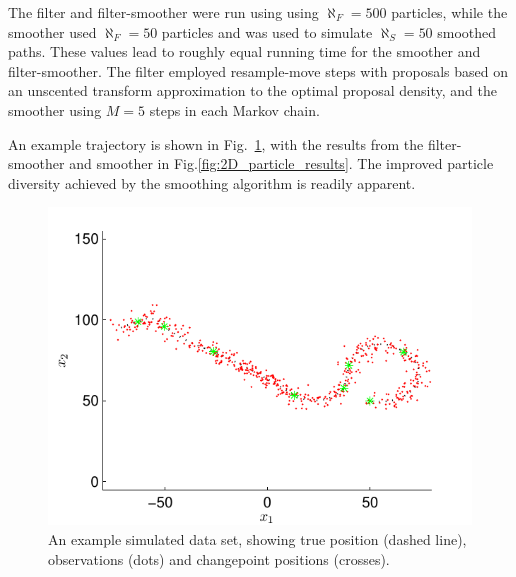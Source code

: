 \documentclass[10pt,twocolumn,twoside]{IEEEtran}
\begin{document}
The filter and filter-smoother were run using using $\aleph_F = 500$ particles, while the smoother used $\aleph_F = 50$ particles and was used to simulate $\aleph_S = 50$ smoothed paths. These values lead to roughly equal running time for the smoother and filter-smoother. The filter employed resample-move steps with proposals based on an unscented transform \cite{Julier2004} approximation to the optimal proposal density, and the smoother using $M=5$ steps in each Markov chain.

An example trajectory is shown in Fig.~\ref{fig:simulated_trajectory}, with the results from the filter-smoother and smoother in Fig.\ref{fig:2D_particle_results}. The improved particle diversity achieved by the smoothing algorithm is readily apparent.
%
\begin{figure}[!t]
\centering
\includegraphics[width=0.9\columnwidth]{simulated_problem.pdf}
\caption{An example simulated data set, showing true position (dashed line), observations (dots) and changepoint positions (crosses). }
\label{fig:simulated_trajectory}
\end{figure}
%
\end{document}
